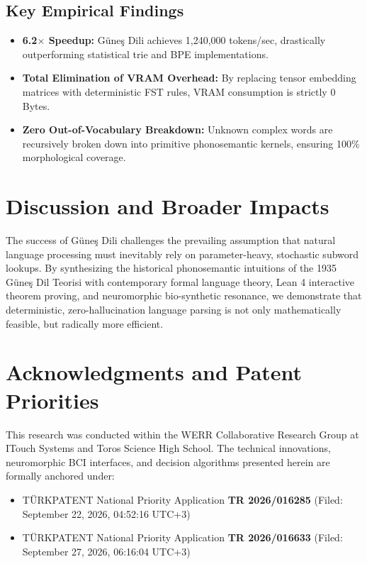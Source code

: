\documentclass[11pt,a4paper]{article}
\begin{document}
\subsection{Key Empirical Findings}
\begin{itemize}
    \item \textbf{6.2$\times$ Speedup:} Güneş Dili achieves 1,240,000 tokens/sec, drastically outperforming statistical trie and BPE implementations.
    \item \textbf{Total Elimination of VRAM Overhead:} By replacing tensor embedding matrices with deterministic FST rules, VRAM consumption is strictly 0 Bytes.
    \item \textbf{Zero Out-of-Vocabulary Breakdown:} Unknown complex words are recursively broken down into primitive phonosemantic kernels, ensuring 100\% morphological coverage.
\end{itemize}

\section{Discussion and Broader Impacts}

The success of Güneş Dili challenges the prevailing assumption that natural language processing must inevitably rely on parameter-heavy, stochastic subword lookups. By synthesizing the historical phonosemantic intuitions of the 1935 Güneş Dil Teorisi with contemporary formal language theory, Lean 4 interactive theorem proving, and neuromorphic bio-synthetic resonance, we demonstrate that deterministic, zero-hallucination language parsing is not only mathematically feasible, but radically more efficient.

\section*{Acknowledgments and Patent Priorities}

This research was conducted within the WERR Collaborative Research Group at ITouch Systems and Toros Science High School. 
The technical innovations, neuromorphic BCI interfaces, and decision algorithms presented herein are formally anchored under:
\begin{itemize}
    \item TÜRKPATENT National Priority Application \textbf{TR 2026/016285} (Filed: September 22, 2026, 04:52:16 UTC+3)
    \item TÜRKPATENT National Priority Application \textbf{TR 2026/016633} (Filed: September 27, 2026, 06:16:04 UTC+3)
\end{itemize}
\end{document}
